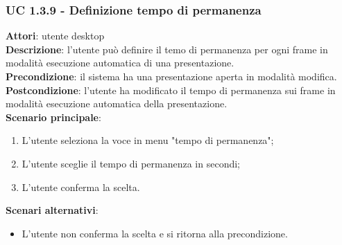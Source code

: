 \subsubsection{UC 1.3.9 - Definizione tempo di permanenza}{
	\label{uc1.3.9}
	\textbf{Attori}: utente desktop \\
	\textbf{Descrizione}: l'utente può definire il temo di permanenza per ogni frame in modalità esecuzione automatica di una presentazione. \\
	\textbf{Precondizione}: il sistema ha una presentazione aperta in modalità modifica.	\\
	\textbf{Postcondizione}: l'utente ha modificato il tempo di permanenza sui frame in modalità esecuzione automatica della presentazione.	\\
	\textbf{Scenario principale}:
	\begin{enumerate}
		\item L'utente seleziona la voce in menu "tempo di permanenza";
		\item L'utente sceglie il tempo di permanenza in secondi;
		\item L'utente conferma la scelta.
	\end{enumerate}
	\textbf{Scenari alternativi}:
	\begin{itemize}
		\item L'utente non conferma la scelta  e si ritorna alla precondizione.
	\end{itemize}
}